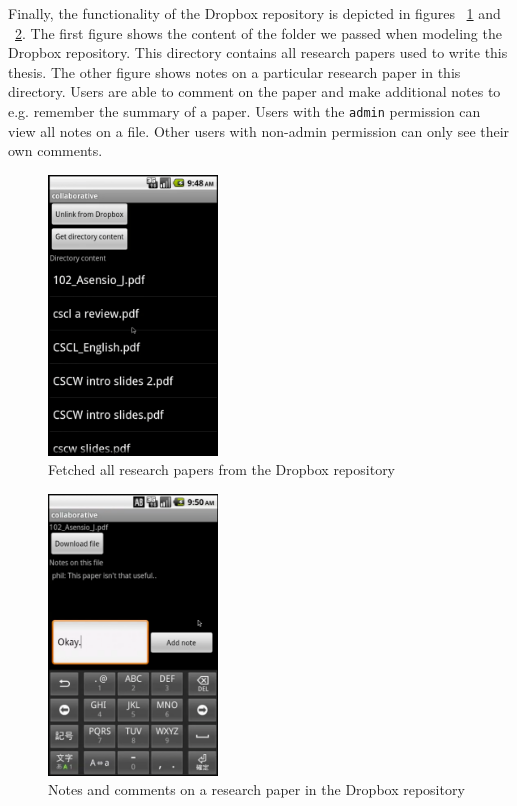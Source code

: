 Finally, the functionality of the Dropbox repository is depicted in figures ~\ref{fig:coll_dropbox1} and ~\ref{fig:coll_dropbox2}. The first figure shows the content of the folder we passed when modeling the Dropbox repository. This directory contains all research papers used to write this thesis. The other figure shows notes on a particular research paper in this directory. Users are able to comment on the paper and make additional notes to e.g. remember the summary of a paper. Users with the \texttt{admin} permission can view all notes on a file. Other users with non-admin permission can only see their own comments.
\begin{figure}[h!]
\centering
\includegraphics[width=0.4\textwidth]{images/chap7_dropbox1.png}
\caption{Fetched all research papers from the Dropbox repository}
\label{fig:coll_dropbox1}
\end{figure}
\begin{figure}[h!]
\centering
\includegraphics[width=0.4\textwidth]{images/chap7_dropbox2.png}
\caption{Notes and comments on a research paper in the Dropbox repository}
\label{fig:coll_dropbox2}
\end{figure}
